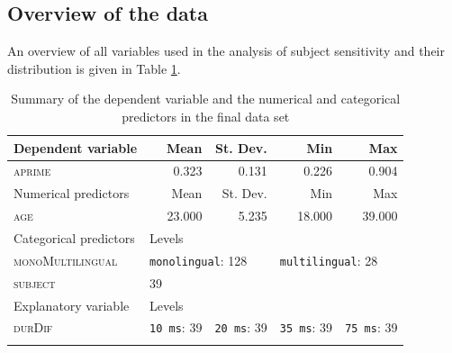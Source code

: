\subsection{Overview of the data}\label{section06_2_2}

An overview of all variables used in the analysis of subject sensitivity and their distribution is given in Table \ref{tab:6.10}.

\begin{table}\fontsize{10}{11}
\caption{Summary of the dependent variable and the numerical and categorical predictors in the final data set}
\label{tab:6.10}
\centering
\begin{tabular}{lllll} 
\lsptoprule
Dependent variable     & \multicolumn{1}{r}{Mean}        & \multicolumn{1}{r}{St. Dev.}                 & \multicolumn{1}{r}{Min}         & \multicolumn{1}{r}{Max}                       \\ 
\midrule
\textsc{aprime}                 & \multicolumn{1}{r}{0.323}       & \multicolumn{1}{r}{0.131}                    & \multicolumn{1}{r}{0.226}       & \multicolumn{1}{r}{0.904}                     \\ 
\midrule
Numerical predictors   & \multicolumn{1}{r}{Mean}        & \multicolumn{1}{r}{St. Dev.}                 & \multicolumn{1}{r}{Min}         & \multicolumn{1}{r}{Max}                       \\ 
\midrule
\textsc{age}                    & \multicolumn{1}{r}{23.000}      & \multicolumn{1}{r}{5.235}                    & \multicolumn{1}{r}{18.000}      & \multicolumn{1}{r}{39.000}                    \\ 
\midrule
Categorical predictors & Levels      & ~                        & ~           & ~                         \\ 
\midrule
\textsc{monoMultilingual}       & \multicolumn{2}{l}{\texttt{monolingual}:
  128} & \multicolumn{2}{l}{\texttt{multilingual}:
  28}  \\
\textsc{subject}                & 39          & ~                        & ~           & ~                         \\ 
\midrule
Explanatory variable   & Levels      & ~                        & ~           & ~                         \\ 
\midrule
\textsc{durDif}                 & \texttt{10 ms}:
  39 & \texttt{20 ms}:
  39              & \texttt{35 ms}:
  39 & \texttt{75 ms}:
  39               \\
\lspbottomrule
\end{tabular}
\end{table}


